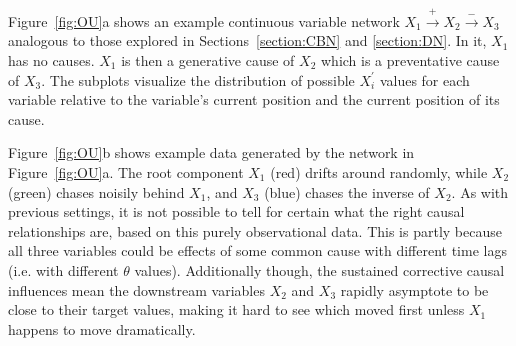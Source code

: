 \documentclass{cambridge7A}%
\newcommand{\ttodo}[2][]{\vspace{0.1cm} \hfil \todo[caption={\textbf{TG}}, size=\footnotesize, color = orange, inline, #1]{#2}}
\newcommand{\ww}{\mathbf{w}} %
\begin{document}

Figure~\ref{fig:OU}a shows an example continuous variable network $X_1\!\stackrel{+}\rightarrow\!X_2\!\stackrel{-}\rightarrow\!X_3$ analogous to those explored in Sections~\ref{section:CBN} and \ref{section:DN}.  In it, $X_1$ has no causes.  $X_1$ is then a generative cause of $X_2$ %
which is a preventative cause of $X_3$. %
The subplots visualize the distribution of possible $X_i^{\prime}$ values for each variable relative to the variable's current position and the current position of its cause.%


Figure~\ref{fig:OU}b shows example data generated by the network in Figure~\ref{fig:OU}a.  The root component $X_1$ (red) drifts around randomly, while $X_2$ (green) chases noisily behind $X_1$, and $X_3$ (blue) chases the inverse of $X_2$.  As with previous settings, it is not possible to tell for certain what the right causal relationships are, based on this purely observational data.  This is partly because all three variables could be effects of some common cause with different time lags (i.e. with different $\theta$ values). Additionally though, the sustained corrective causal influences mean the downstream variables $X_2$ and $X_3$ rapidly asymptote to be close to their target values, making it hard to see which moved first unless $X_1$ happens to move dramatically.  
\end{document}
